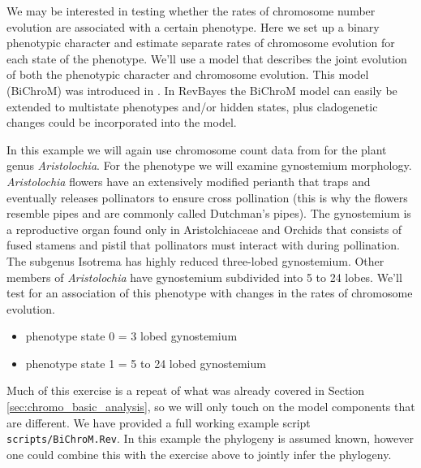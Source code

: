 We may be interested in testing whether the rates of chromosome number evolution
are associated with a certain phenotype.
Here we set up a binary phenotypic character and estimate separate rates of chromosome
evolution for each state of the phenotype. 
We'll use a model that describes the joint evolution of both the
phenotypic character and chromosome evolution. This model (BiChroM) was introduced in \citet{zenil2017testing}. In RevBayes the BiChroM model can easily be extended to multistate phenotypes and/or 
hidden states, plus cladogenetic changes could be incorporated into the model.

In this example we will again use chromosome count data from \citet{ohi2006molecular} for the plant 
genus \textit{Aristolochia}. 
For the phenotype we will examine gynostemium morphology. \textit{Aristolochia} flowers have an extensively 
modified perianth that traps and eventually releases pollinators to ensure cross pollination 
(this is why the flowers resemble pipes and are commonly called Dutchman's pipes). The gynostemium 
is a reproductive organ found only in Aristolchiaceae and Orchids that consists of fused stamens 
and pistil that pollinators must interact with during pollination. The subgenus Isotrema has highly
reduced three-lobed gynostemium. Other members of \textit{Aristolochia} have gynostemium subdivided into
5 to 24 lobes. We'll test for an association of this phenotype with changes in the rates of 
chromosome evolution. 
\begin{itemize}
\item phenotype state 0 = 3 lobed gynostemium
\item phenotype state 1 = 5 to 24 lobed gynostemium
\end{itemize}
Much of this exercise is a repeat of what was already covered in Section \ref{sec:chromo_basic_analysis},
so we will only touch on the model components that are different.
We have provided a full working example script \texttt{scripts/BiChroM.Rev}.
In this example the phylogeny is assumed known, however one could combine this with the exercise above
to jointly infer the phylogeny.

\begin{figure}[h!]
\label{fig:bichrom_rates}
\end{figure}

